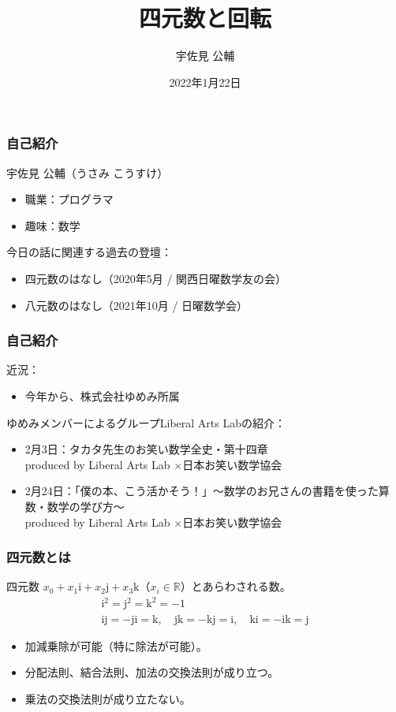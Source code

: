 \documentclass{beamer}
\title{四元数と回転}
\author{宇佐見 公輔}
\date{2022年1月22日}
\newcommand{\ii}{\mathrm{i}}
\newcommand{\jj}{\mathrm{j}}
\newcommand{\kk}{\mathrm{k}}
\begin{document}
\maketitle

\begin{frame}
    \frametitle{自己紹介}
    宇佐見 公輔（うさみ こうすけ）
    \begin{itemize}
        \item 職業：プログラマ
        \item 趣味：数学
    \end{itemize}

    \bigskip
    今日の話に関連する過去の登壇：
    \begin{itemize}
        \item 四元数のはなし（2020年5月 / 関西日曜数学友の会）
        \item 八元数のはなし（2021年10月 / 日曜数学会）
    \end{itemize}
\end{frame}

\begin{frame}
    \frametitle{自己紹介}
    近況：\\
    \begin{itemize}
        \item 今年から、株式会社ゆめみ所属
    \end{itemize}

    \bigskip
    ゆめみメンバーによるグループLiberal Arts Labの紹介：
    \begin{itemize}
        \item 2月3日：タカタ先生のお笑い数学全史・第十四章\\produced by Liberal Arts Lab ×日本お笑い数学協会
        \item 2月24日：「僕の本、こう活かそう！」〜数学のお兄さんの書籍を使った算数・数学の学び方〜\\produced by Liberal Arts Lab ×日本お笑い数学協会
    \end{itemize}
\end{frame}

\begin{frame}
    \frametitle{四元数とは}
    \begin{block}{四元数}
        \(x_0+x_1\ii+x_2\jj+x_3\kk\)（\(x_i\in\mathbb{R}\)）とあらわされる数。
        \begin{gather*}
            \ii^2=\jj^2=\kk^2=-1\\
            \ii\jj=-\jj\ii=\kk,\quad\jj\kk=-\kk\jj=\ii,\quad\kk\ii=-\ii\kk=\jj
        \end{gather*}
    \end{block}
    \begin{itemize}
        \item 加減乗除が可能（特に除法が可能）。
        \item 分配法則、結合法則、加法の交換法則が成り立つ。
        \item 乗法の交換法則が成り立たない。
    \end{itemize}
\end{frame}
\end{document}
